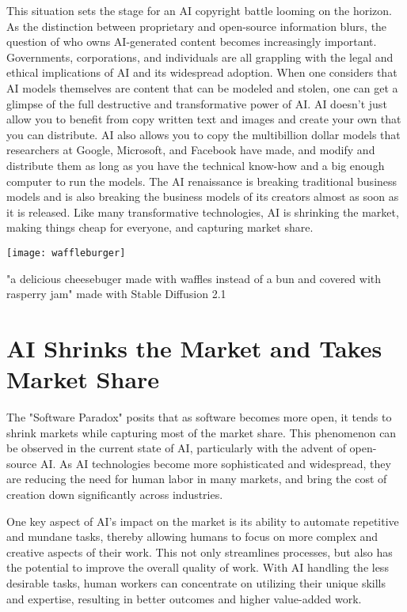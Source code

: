 This situation sets the stage for an AI copyright battle looming on the horizon. As the distinction between proprietary and open-source information blurs, the question of who owns AI-generated content becomes increasingly important. Governments, corporations, and individuals are all grappling with the legal and ethical implications of AI and its widespread adoption. When one considers that AI models themselves are content that can be modeled and stolen, one can get a glimpse of the full destructive and transformative power of AI. AI doesn’t just allow you to benefit from copy written text and images and create your own that you can distribute. AI also allows you to copy the multibillion dollar models that researchers at Google, Microsoft, and Facebook have made, and modify and distribute them as long as you have the technical know-how and a big enough computer to run the models. The AI renaissance is breaking traditional business models and is also breaking the business models of its creators almost as soon as it is released. Like many transformative technologies, AI is shrinking the market, making things cheap for everyone, and capturing market share.

\begin{pdf}
\begin{marginfigure}[-5.5cm]
    \texttt{[image: waffleburger]}
        \caption{"a delicious cheesebuger made with waffles instead of a bun and covered with rasperry jam" made with Stable Diffusion 2.1}
\end{marginfigure}
\end{pdf}

\section{AI Shrinks the Market and Takes Market Share}

The "Software Paradox" posits that as software becomes more open, it tends to shrink markets while capturing most of the market share. This phenomenon can be observed in the current state of AI, particularly with the advent of open-source AI. As AI technologies become more sophisticated and widespread, they are reducing the need for human labor in many markets, and bring the cost of creation down significantly across industries.

One key aspect of AI’s impact on the market is its ability to automate repetitive and mundane tasks, thereby allowing humans to focus on more complex and creative aspects of their work. This not only streamlines processes, but also has the potential to improve the overall quality of work. With AI handling the less desirable tasks, human workers can concentrate on utilizing their unique skills and expertise, resulting in better outcomes and higher value-added work.


